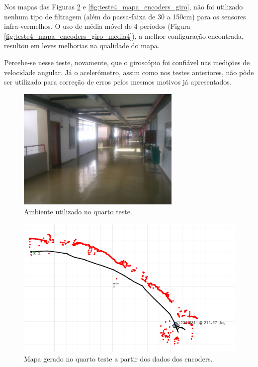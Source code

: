 Nos mapas das Figuras \ref{fig:teste4_mapa_encoders} e \ref{fig:teste4_mapa_encoders_giro}, não foi utilizado nenhum tipo de filtragem (além do passa-faixa de 30 a 150cm) para os sensores infra-vermelhos. O uso de média móvel de 4 períodos (Figura \ref{fig:teste4_mapa_encoders_giro_media4}), a melhor configuração encontrada, resultou em leves melhorias na qualidade do mapa.

Percebe-se nesse teste, novamente, que o giroscópio foi confiável nas medições de velocidade angular. Já o acelerômetro, assim como nos testes anteriores, não pôde ser utilizado para correção de erros pelos mesmos motivos já apresentados. %

\begin{figure}[H]
	\centering
	\includegraphics[width=0.7\textwidth]{./figuras/testes/teste4/foto_ambiente.jpg}
	\caption{Ambiente utilizado no quarto teste.}
	\label{fig:teste4_foto}
\end{figure}

\begin{figure}[H]
	\centering
	\includegraphics[width=1\textwidth]{./figuras/testes/teste4/mapa_encoders.png}
	\caption{Mapa gerado no quarto teste a partir dos dados dos encoders.}
	\label{fig:teste4_mapa_encoders}
\end{figure}

